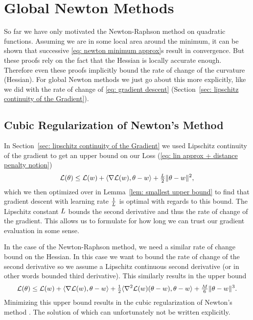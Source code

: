 \section{Global Newton Methods}

So far we have only motivated the Newton-Raphson method on quadratic functions.
Assuming we are in some local area around the minimum, it can be shown that
successive \ref{eq: newton minimum approx}s result in convergence. But these
proofs rely on the fact that the Hessian is locally accurate enough. Therefore
even these proofs implicitly bound the rate of change of the curvature (Hessian).
For global Newton methods we just go about this more explicitly, like we did
with the rate of change of \ref{eq: gradient descent} (Section~\ref{sec:
lipschitz continuity of the Gradient}).

\subsection{Cubic Regularization of Newton's Method}

 In Section~\ref{sec: lipschitz continuity of the Gradient} we used Lipschitz
 continuity of the gradient to get an upper bound on our Loss (\ref{eq: lin
 approx + distance penalty notion})
\begin{align*}
	\mathcal{L}(\theta)
	\le \mathcal{L}(w) + \langle \nabla\mathcal{L}(w), \theta-w \rangle
	+ \tfrac{L}2 \|\theta-w\|^2,
\end{align*}
which we then optimized over in Lemma~\ref{lem: smallest upper bound} to find
that gradient descent with learning rate \(\tfrac1{L}\) is optimal with
regards to this bound. The Lipschitz constant \(L\) bounds the second
derivative and thus the rate of change of the gradient. This allows us to
formulate for how long we can trust our gradient evaluation in some sense.

In the case of the Newton-Raphson method, we need a similar rate of change
bound on the Hessian. In this case we want to bound the rate of change of the
second derivative so we assume a Lipschitz continuous second derivative (or 
in other words bounded third derivative). This similarly results in the upper
bound
\begin{align*}
	\mathcal{L}(\theta)
	\le \mathcal{L}(w) + \langle \nabla\mathcal{L}(w), \theta-w \rangle
	+ \tfrac12\langle \nabla^2\mathcal{L}(w)(\theta-w), \theta-w \rangle
	+ \tfrac{M}6\|\theta-w\|^3.
\end{align*}
Minimizing this upper bound results in the cubic regularization of Newton's method
\parencite[Section 4.1]{nesterovLecturesConvexOptimization2018}.
The solution of which can unfortunately not be written explicitly.


